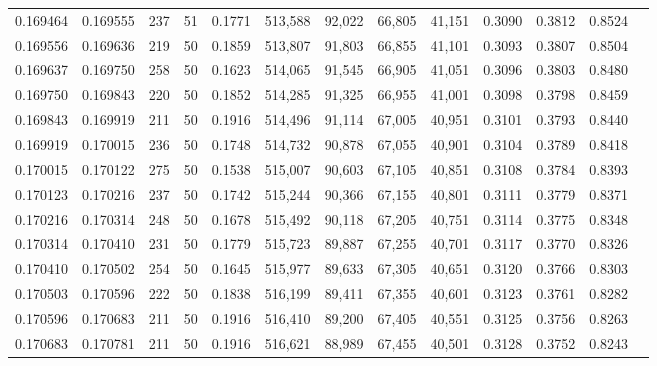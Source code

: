 \begin{tabular}{rrrrrrrrrrrrr}
0.169464 & 0.169555 &   237 &  51 &                                     0.1771 & 513,588 &  92,022 &  66,805 &  41,151 & 0.3090 & 0.3812 & 0.8524 \\
0.169556 & 0.169636 &   219 &  50 &                                     0.1859 & 513,807 &  91,803 &  66,855 &  41,101 & 0.3093 & 0.3807 & 0.8504 \\
0.169637 & 0.169750 &   258 &  50 &                                     0.1623 & 514,065 &  91,545 &  66,905 &  41,051 & 0.3096 & 0.3803 & 0.8480 \\
0.169750 & 0.169843 &   220 &  50 &                                     0.1852 & 514,285 &  91,325 &  66,955 &  41,001 & 0.3098 & 0.3798 & 0.8459 \\
0.169843 & 0.169919 &   211 &  50 &                                     0.1916 & 514,496 &  91,114 &  67,005 &  40,951 & 0.3101 & 0.3793 & 0.8440 \\
0.169919 & 0.170015 &   236 &  50 &                                     0.1748 & 514,732 &  90,878 &  67,055 &  40,901 & 0.3104 & 0.3789 & 0.8418 \\
0.170015 & 0.170122 &   275 &  50 &                                     0.1538 & 515,007 &  90,603 &  67,105 &  40,851 & 0.3108 & 0.3784 & 0.8393 \\
0.170123 & 0.170216 &   237 &  50 &                                     0.1742 & 515,244 &  90,366 &  67,155 &  40,801 & 0.3111 & 0.3779 & 0.8371 \\
0.170216 & 0.170314 &   248 &  50 &                                     0.1678 & 515,492 &  90,118 &  67,205 &  40,751 & 0.3114 & 0.3775 & 0.8348 \\
0.170314 & 0.170410 &   231 &  50 &                                     0.1779 & 515,723 &  89,887 &  67,255 &  40,701 & 0.3117 & 0.3770 & 0.8326 \\
0.170410 & 0.170502 &   254 &  50 &                                     0.1645 & 515,977 &  89,633 &  67,305 &  40,651 & 0.3120 & 0.3766 & 0.8303 \\
0.170503 & 0.170596 &   222 &  50 &                                     0.1838 & 516,199 &  89,411 &  67,355 &  40,601 & 0.3123 & 0.3761 & 0.8282 \\
0.170596 & 0.170683 &   211 &  50 &                                     0.1916 & 516,410 &  89,200 &  67,405 &  40,551 & 0.3125 & 0.3756 & 0.8263 \\
0.170683 & 0.170781 &   211 &  50 &                                     0.1916 & 516,621 &  88,989 &  67,455 &  40,501 & 0.3128 & 0.3752 & 0.8243 \\

\end{tabular}
